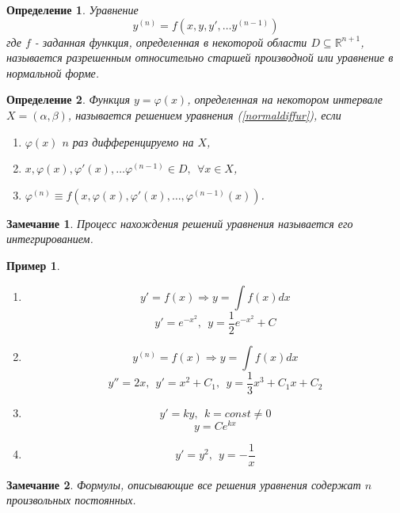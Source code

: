 \documentclass{article}
\newtheorem*{df}{Определение}
\newtheorem*{ntc}{Замечание}
\newtheorem{xmp}{Пример}
\begin{document}
  \begin{df}
  Уравнение 
  \begin{equation}
  \label{normaldiffur}
  y^{(n)} = f(x, y, y', \ldots y^{(n-1)})
  \end{equation}
  где $f$ - заданная функция, определенная в некоторой области $D \subseteq \mathbb{R}^{n+1}$, называется разрешенным относительно старшей производной или уравнение в нормальной форме.
  \end{df}
  
  \begin{df}
  Функция $y = \varphi(x)$, определенная на некотором интервале $X = (\alpha, \beta)$, называется решением уравнения (\ref{normaldiffur}), если 
  \begin{enumerate}
  \item $\varphi(x)$ $n$ раз дифференцируемо на $X$,
  \item $x, \varphi(x), \varphi'(x), \ldots \varphi^{(n - 1)} \in D,~~ \forall x \in X$,
  \item $\varphi^{(n)} \equiv f(x, \varphi(x), \varphi'(x), \ldots, \varphi^{(n - 1)}(x))$.
  \end{enumerate}
  \end{df}
  \begin{ntc}
  Процесс нахождения решений уравнения называется его интегрированием.
  \end{ntc}
  
  \begin{xmp}
  ~
  \begin{enumerate}
  \item $$ y' = f(x) \Rightarrow y = \int f(x) dx $$
  $$ y' = e^{-x^2},~~ y = \frac{1}{2}e^{-x^2} + C $$
  \item $$ y^{(n)} = f(x) \Rightarrow y = \int f(x) dx $$
  $$ y'' = 2x,~~ y' = x^2 + C_1,~~ y = \frac{1}{3}x^3 + C_1 x + C_2 $$ 
  \item $$ y' = ky,~~ k = const \neq 0 $$
  $$ y = Ce^{kx} $$
  \item $$ y' = y^2,~~ y = -\frac{1}{x} $$
  \end{enumerate}
  \end{xmp}

  \begin{ntc}
  Формулы, описывающие все решения уравнения содержат $n$ произвольных постоянных.
  \end{ntc}  
  
\end{document}
